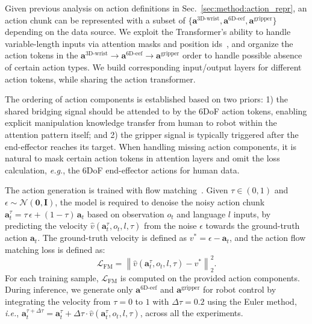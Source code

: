 %
Given previous analysis on action definitions in Sec.~\ref{sec:method:action_repr}, an action chunk can be represented with a subset of $\{\mathbf{a}^{\text{3D-wrist}},\mathbf{a}^{\text{6D-eef}},\mathbf{a}^{\text{gripper}}\}$ depending on the data source. 
% 
We exploit the Transformer's ability to handle variable-length inputs via attention masks and position ids~\cite{vaswani2017attention}, and organize the action tokens in the
$\mathbf{a}^{\text{3D-wrist}} \rightarrow \mathbf{a}^{\text{6D-eef}} \rightarrow \mathbf{a}^{\text{gripper}}$ order to handle possible absence of certain action types.
% 
We build corresponding input/output layers for different action tokens, while sharing the action transformer.



The ordering of action components is established based on two priors: 
% 
1) the shared bridging signal should be attended to by the 6DoF action tokens, enabling explicit manipulation knowledge transfer from human to robot within the attention pattern itself; 
% 
and 2) the gripper signal is typically triggered after the end-effector reaches its target.
% 
When handling missing action components, it is natural to mask certain action tokens in attention layers and omit the loss calculation, \textit{e.g.}, the 6DoF end-effector actions for human data.




%
The action generation is trained with flow matching~\cite{lipman2022flow,liu2022flow}. 
% 
Given $\tau\!\in\!(0,1)$ and $\epsilon\!\sim\!\mathcal{N}(\mathbf{0}, \mathbf{I})$, the model is required to denoise the noisy action chunk $\mathbf{a}^{\tau}_{t} = \tau\,\epsilon + (1-\tau)\,\mathbf{a}_{t}$ based on observation $o_t$ and language $l$ inputs, by predicting the velocity $\hat v(\mathbf{a}^{\tau}_t, o_t, l, \tau)$ from the noise $\epsilon$ towards the ground-truth action $\mathbf{a}_{t}$.
% 
The ground-truth velocity is defined as $v^* = \epsilon - \mathbf{a}_{t}$, and the action flow matching loss is defined as:
%
\begin{equation}
    \mathcal{L}_{\text{FM}} = \left\|\hat v(\mathbf{a}^{\tau}_{t}, o_t, l, \tau) - v^*\right\|_2^2.
\end{equation}
%
For each training sample, $\mathcal{L}_{\text{FM}}$ is computed on the provided action components. 
% 
During inference, we generate only $\mathbf{a}^{\text{6D-eef}}$ and $\mathbf{a}^{\text{gripper}}$ for robot control by integrating the velocity from $\tau\!=\!0$ to $1$ with $\Delta \tau = 0.2$ using the Euler method, \textit{i.e.}, $\mathbf{a}^{\tau + \Delta \tau}_{t} = \mathbf{a}^{\tau}_{t} + \Delta\tau \cdot \hat v(\mathbf{a}^{\tau}_{t}, o_t, l, \tau)$, across all the experiments.
% 





